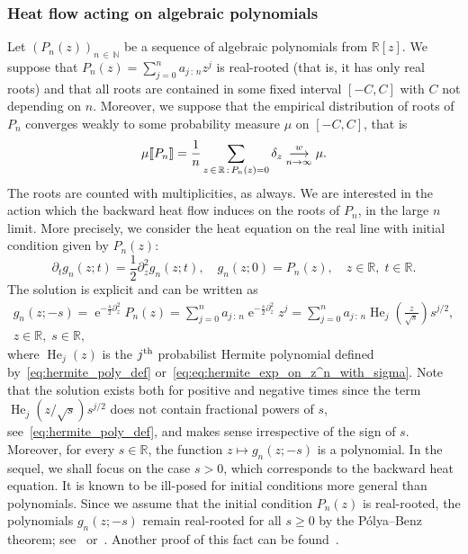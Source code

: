 \documentclass[AHL,Unicode,longabstracts,published]{cedram}
\newcommand{\llbracket}{\mathopen{[\mkern -2.7mu[}}
\newcommand{\rrbracket}{\mathclose{]\mkern -2.7mu]}}
\newcommand{\lsem}{\llbracket}
\newcommand{\rsem}{\rrbracket}
\DeclareMathOperator*{\He}{He}
\DeclareMathOperator{\eee}{e}
\newcommand{\R}{\mathbb{R}}
\newcommand{\N}{\mathbb{N}}
\newcommand{\toweak}{\overset{w}{\underset{n\to\infty}\longrightarrow}}
\begin{document}
\subsubsection{Heat flow acting on algebraic polynomials} Let $(P_n(z))_{n\,\in\,\N}$ be a sequence of algebraic polynomials from $\R[z]$. We suppose that $P_n(z) = \sum_{j=0}^n a_{j\,:\,n}z^j$ is real-rooted (that is, it has only real roots) and that all roots are contained in some fixed interval $[-C,C]$ with $C$ not depending on $n$. Moreover, we suppose that the empirical distribution of roots of $P_n$ converges weakly to some probability measure $\mu$ on $[-C,C]$, that is
\begin{equation}\label{eq:empirical_distr_zeroes_conv_algebraic}
\mu\lsem P_n \rsem = \frac 1n \sum_{\substack{z\,\in\,\R\,:\, P_n(z) = 0}} \delta_z \toweak \mu.
\end{equation}
The roots are counted with multiplicities, as always. We are interested in the action which the backward heat flow induces on the roots of $P_n$, in the large $n$ limit. More precisely, we consider the heat equation on the real line with initial condition given by $P_n(z)$:
\begin{equation}\label{eq:heat_equation_algebraic}
\partial_t g_{n}(z; t) = \frac 12 \partial^2_z g_{n}(z;t),
\quad g_n(z; 0) = P_{n}(z),
\quad z\in\R,\; t\in \R.
\end{equation}
The solution is explicit and can be written as
\begin{multline}\label{eq:heat_eq_solution_alg}
g_{n} (z; -s) =
\eee^{-\frac s2 \partial_z^2} P_{n}(z) =
\sum_{j=0}^n a_{j\,:\,n} \eee^{-\frac s2 \partial_z^2} z^j =
\sum_{j=0}^n a_{j\,:\,n} \He\nolimits_j\left(\frac{z}{\sqrt s}\right) s^{j/2},
\\
z\in \R, \; s\in \R,
\end{multline}
where $\He_j(z)$ is the $j^{\text{\normalfont th}}$ probabilist Hermite polynomial defined by~\eqref{eq:hermite_poly_def} or~\eqref{eq:eq:hermite_exp_on_z^n_with_sigma}. Note that the solution exists both for positive and negative times since the term $\He_j(z/\sqrt s) s^{j/2}$ does not contain fractional powers of $s$, see~\eqref{eq:hermite_poly_def}, and makes sense irrespective of the sign of $s$. Moreover, for every $s\in \R$, the function $z\mapsto g_n(z; -s)$ is a polynomial. In the sequel, we shall focus on the case $s>0$, which corresponds to the backward heat equation. It is known to be ill-posed for initial conditions more general than polynomials. Since we assume that the initial condition $P_n(z)$ is real-rooted, the polynomials $g_n(z; -s)$ remain real-rooted for all $s\geq 0$ by the Pólya--Benz theorem; see~\cite{benz} or~\cite[Theorem~1.2]{aleman_beliaev_hedenmalm}. Another proof of this fact can be found~\cite{tao_blog1}.
\end{document}
